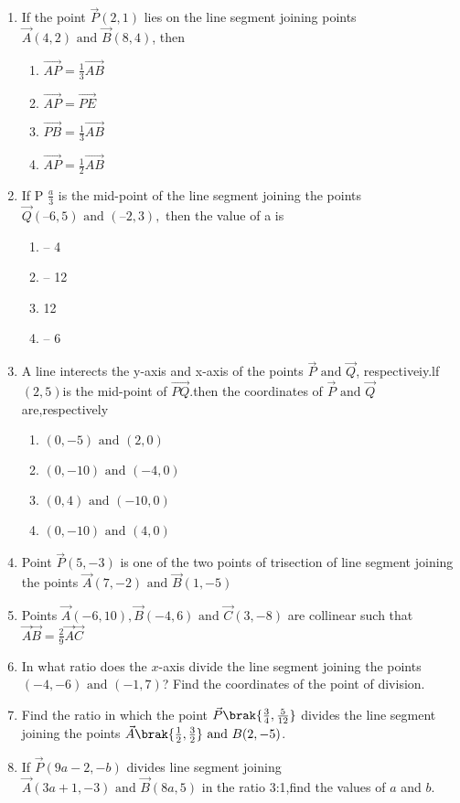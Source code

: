 \begin{enumerate}[label=\thesection.\arabic*,ref=\thesection.\theenumi]
\item If the point $\vec{P} (2, 1)$ lies on the line segment joining points$\vec{A} (4, 2) \text{ and } \vec{B} (8, 4)$,
then
\begin{enumerate}
	\item $\vec{AP} =\frac{1}{3}\vec{AB}$ 
\item $\vec{AP}=\vec{PE}$
\item $\vec{PB}=\frac{1}{3}\vec{AB}$
\item$\vec{AP}=\frac{1}{2}\vec{AB}$
 \end{enumerate}
 \item If P $\frac{a}{3}$ is the mid-point of the line segment joining the points $\vec{Q} (– 6, 5) \text{ and }(– 2, 3),$ then the value of a is
\begin{enumerate}
\item – 4
\item – 12
\item 12
\item – 6
\end{enumerate}
\item A line interects the y-axis and x-axis of the points $\vec{P} \text{ and }\vec{Q}$, respectiveiy.lf $(2,5)$is the mid-point of $\vec{PQ}$.then the coordinates of $\vec{P} \text{ and } \vec{Q}$ are,respectively
\begin{enumerate}
	\item$(0,-5)\text{ and }(2,0)$
	\item$(0,-10)\text{ and }(-4,0)$
	\item$(0,4)\text{ and } (-10,0)$
	\item$(0,-10)\text{ and }(4,0)$
\end{enumerate}
\item Point $\vec{P}(5,-3)$ is one of the two points of trisection of line segment joining the points $\vec{A}(7,-2)\text{ and }\vec{B}(1,-5)$
\item Points $\vec{A}(-6,10),\vec{B}(-4,6) \text{ and } \vec{C}(3,-8)$ are collinear such that $\vec{A}\vec{B}=  \frac{2}{9}\vec{A}\vec{C}$
\item In what ratio does the $x$-axis divide the line segment joining the points $(-4,-6)\text{ and }(-1,7)$? Find the coordinates of the point of division.
\item Find the ratio in which the point $\vec{P}\brak{\frac{3}{4},\frac{5}{12}}$ divides the line segment joining the points $\vec{A}\brak{\frac{1}{2},\frac{3}{2}}\text{ and }{B}(2,-5)$.
\item If $\vec{P}(9a-2,-b)$ divides line segment joining $\vec{A}(3a+1,-3)\text{ and }\vec{B}(8a,5)$ in the ratio 3:1,find the values of $a$ and $b$.

\end{enumerate}

